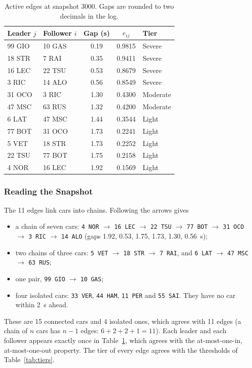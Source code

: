 \documentclass[11pt,a4paper]{article}
\begin{document}
\begin{table}[H]
\centering
\caption{Active edges at snapshot 3000. Gaps are rounded to two decimals in the log.}
\label{tab:edges}
\small
\begin{tabular}{@{}llccl@{}}
\toprule
\textbf{Leader $j$} & \textbf{Follower $i$} & \textbf{Gap (s)} & \textbf{$e_{ij}$} & \textbf{Tier} \\
\midrule
99 GIO & 10 GAS & 0.19 & 0.9815 & \cellcolor{f1red!35}Severe \\
18 STR & 7 RAI  & 0.35 & 0.9411 & \cellcolor{f1red!35}Severe \\
16 LEC & 22 TSU & 0.53 & 0.8679 & \cellcolor{f1red!35}Severe \\
3 RIC  & 14 ALO & 0.56 & 0.8549 & \cellcolor{f1red!35}Severe \\
31 OCO & 3 RIC  & 1.30 & 0.4300 & \cellcolor{f1orange!35}Moderate \\
47 MSC & 63 RUS & 1.32 & 0.4200 & \cellcolor{f1orange!35}Moderate \\
6 LAT  & 47 MSC & 1.44 & 0.3544 & \cellcolor{f1green!35}Light \\
77 BOT & 31 OCO & 1.73 & 0.2241 & \cellcolor{f1green!35}Light \\
5 VET  & 18 STR & 1.73 & 0.2252 & \cellcolor{f1green!35}Light \\
22 TSU & 77 BOT & 1.75 & 0.2158 & \cellcolor{f1green!35}Light \\
4 NOR  & 16 LEC & 1.92 & 0.1569 & \cellcolor{f1green!35}Light \\
\bottomrule
\end{tabular}
\end{table}

\subsubsection{Reading the Snapshot}
The 11 edges link cars into chains. Following the arrows gives
\begin{itemize}[leftmargin=*]
  \item a chain of seven cars:
        \texttt{4 NOR} $\to$ \texttt{16 LEC} $\to$ \texttt{22 TSU} $\to$
        \texttt{77 BOT} $\to$ \texttt{31 OCO} $\to$ \texttt{3 RIC} $\to$
        \texttt{14 ALO} (gaps 1.92, 0.53, 1.75, 1.73, 1.30, 0.56~s);
  \item two chains of three cars:
        \texttt{5 VET} $\to$ \texttt{18 STR} $\to$ \texttt{7 RAI}, and
        \texttt{6 LAT} $\to$ \texttt{47 MSC} $\to$ \texttt{63 RUS};
  \item one pair, \texttt{99 GIO} $\to$ \texttt{10 GAS};
  \item four isolated cars: \texttt{33 VER}, \texttt{44 HAM}, \texttt{11 PER}
        and \texttt{55 SAI}. They have no car within 2~s ahead.
\end{itemize}
These are 15 connected cars and 4 isolated ones, which agrees with 11 edges
(a chain of $n$ cars has $n-1$ edges: $6+2+2+1=11$). Each leader and each
follower appears exactly once in Table~\ref{tab:edges}, which agrees with the
at-most-one-in, at-most-one-out property. The tier of every edge agrees with
the thresholds of Table~\ref{tab:tiers}.
\end{document}
